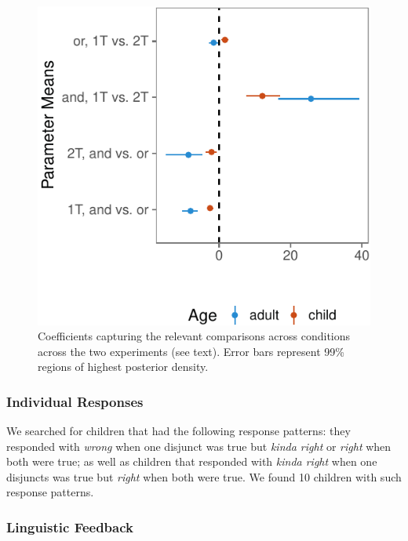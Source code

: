 \documentclass[10pt, letterpaper]{article}
\newenvironment{CodeChunk}{}{}
\begin{document}
\begin{CodeChunk}
\begin{figure}[t]

{\centering \includegraphics{figs/model-plot-1} 

}

\caption[Coefficients capturing the relevant comparisons across conditions across the two experiments (see text)]{Coefficients capturing the relevant comparisons across conditions across the two experiments (see text). Error bars represent 99\% regions of highest posterior density.}\label{fig:model-plot}
\end{figure}
\end{CodeChunk}

\subsubsection{Individual Responses}\label{individual-responses-1}

We searched for children that had the following response patterns: they
responded with \emph{wrong} when one disjunct was true but \emph{kinda
right} or \emph{right} when both were true; as well as children that
responded with \emph{kinda right} when one disjuncts was true but
\emph{right} when both were true. We found 10 children with such
response patterns.

\subsubsection{Linguistic Feedback}\label{linguistic-feedback}
\end{document}
